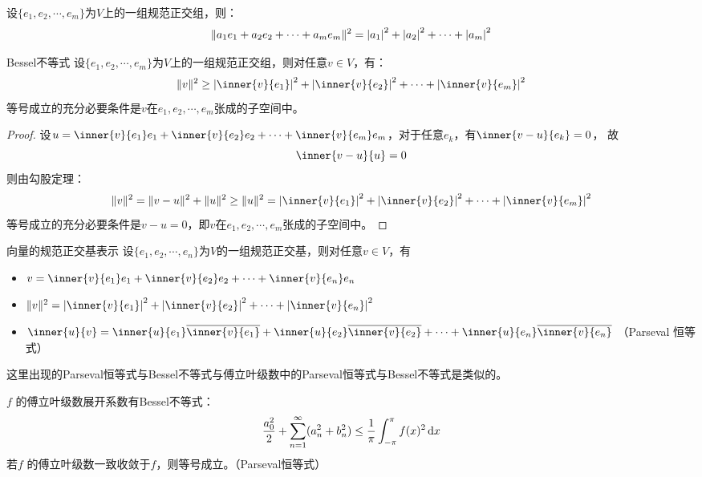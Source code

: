 \begin{corollary}
    设\(\{e_1, e_2, \cdots, e_m\}\)为\(V\)上的一组规范正交组，则：\[
        \lVert a_1 e_1 + a_2 e_2 + \cdots + a_m e_m\rVert^{2} =
        \left|a_1\right|^{2} + \left|a_2\right|^{2} + \cdots + \left|a_m\right|^{2}
    \]
\end{corollary}

\begin{theorem}{Bessel不等式}
    设\(\{e_1, e_2, \cdots, e_m\}\)为\(V\)上的一组规范正交组，则对任意\(v \in V\)，有：
    \[
        \norm{v}^{2} \geq \abs{\inner{v}{e_1}}^{2} +
        \abs{\inner{v}{e_2}}^{2} + \cdots + \abs{\inner{v}{e_m}}^{2}
    \]
    等号成立的充分必要条件是\(v\)在\(e_1, e_2, \cdots, e_m\)张成的子空间中。
\end{theorem}

\begin{proof}
    设\(u = \inner{v}{e_1} e_1 + \inner{v}{e_2} e_2 + \cdots +
    \inner{v}{e_m} e_m\)，对于任意\(e_{k}\)，有\(\inner{v-u}{e_k} = 0\)，
    故\[
        \inner{v-u}{u} = 0
    \]
    则由勾股定理：
    \[
        \norm{v}^{2} = \norm{v-u}^{2} + \norm{u}^{2} \geq
        \norm{u}^{2} = \abs{\inner{v}{e_1}}^{2} +
        \abs{\inner{v}{e_2}}^{2} + \cdots + \abs{\inner{v}{e_m}}^{2}
    \]
    等号成立的充分必要条件是\(v-u = 0\)，即\(v\)在\(e_1, e_2, \cdots, e_m\)张成的子空间中。
\end{proof}

\begin{corollary}{向量的规范正交基表示}
    设\(\{e_1, e_2, \cdots, e_n\}\)为\(V\)的一组规范正交基，则对任意\(v \in V\)，有
    \begin{itemize}
        \item \(v = \inner{v}{e_1} e_1 + \inner{v}{e_2} e_2 + \cdots +
            \inner{v}{e_n} e_n\)
        \item \(\norm{v}^{2} = \abs{\inner{v}{e_1}}^{2} +
            \abs{\inner{v}{e_2}} ^{2} + \cdots + \abs{\inner{v}{e_n}}^{2}\)
        \item \(\inner{u}{v} = \inner{u}{e_1} \conj{\inner{v}{e_1}} +
                \inner{u}{e_2} \conj{\inner{v}{e_2}} + \cdots + \inner{u}{e_n}
            \conj{\inner{v}{e_n}}\) （Parseval 恒等式）
    \end{itemize}
\end{corollary}

这里出现的Parseval恒等式与Bessel不等式与傅立叶级数中的Parseval恒等式与Bessel不等式是类似的。
\begin{note}{}
    \(f\) 的傅立叶级数展开系数有Bessel不等式：
    \[
        \frac{a_{0}^{2}}{2} + \sum_{n=1}^{\infty} (a_n^2 + b_n^2) \leq
        \frac{1}{\pi} \int_{-\pi}^{\pi} f (x)^{2} \d{x}
    \]
    若\(f\) 的傅立叶级数一致收敛于\(f\)，则等号成立。（Parseval恒等式）
\end{note}

